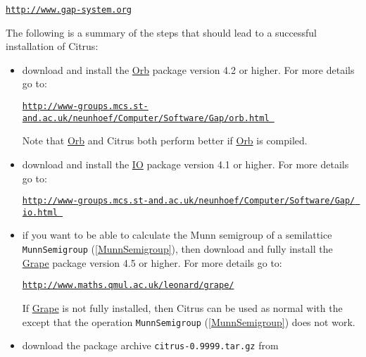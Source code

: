 \documentclass[a4paper,11pt]{report}
\begin{document}
{{\noindent\vspace{\baselineskip} \href{http://www.gap-system.org} {\texttt{http://www.gap-system.org}}

 \noindent The following is a summary of the steps that should lead to a successful
installation of \textsf{Citrus}: 
\begin{itemize}
\item  download and install the \href{ http://www-groups.mcs.st-and.ac.uk/~neunhoef/Computer/Software/Gap/orb.html } {Orb} package version 4.2 or higher. For more details go to: \vspace{\baselineskip}

\noindent \href{http://www-groups.mcs.st-and.ac.uk/~neunhoef/Computer/Software/Gap/orb.html } {\texttt{http://www-groups.mcs.st-and.ac.uk/\texttt{}neunhoef/Computer/Software/Gap/orb.html }}

 \noindent Note that \href{ http://www-groups.mcs.st-and.ac.uk/~neunhoef/Computer/Software/Gap/orb.html } {Orb} and \textsf{Citrus} both perform better if \href{ http://www-groups.mcs.st-and.ac.uk/~neunhoef/Computer/Software/Gap/orb.html } {Orb} is compiled. 
\item  download and install the \href{ http://www-groups.mcs.st-and.ac.uk/~neunhoef/Computer/Software/Gap/io.html } {IO} package version 4.1 or higher. For more details go to: \vspace{\baselineskip}

\noindent \href{http://www-groups.mcs.st-and.ac.uk/~neunhoef/Computer/Software/Gap/ io.html } {\texttt{http://www-groups.mcs.st-and.ac.uk/\texttt{}neunhoef/Computer/Software/Gap/ io.html }} 
\item  if you want to be able to calculate the Munn semigroup of a semilattice \texttt{MunnSemigroup} (\ref{MunnSemigroup}), then download and fully install the \href{http://www.maths.qmul.ac.uk/~leonard/grape/} {Grape} package version 4.5 or higher. For more details go to:\vspace{\baselineskip}

\noindent \href{http://www.maths.qmul.ac.uk/~leonard/grape/} {\texttt{http://www.maths.qmul.ac.uk/\texttt{}leonard/grape/}}

 If \href{http://www.maths.qmul.ac.uk/~leonard/grape/} {Grape} is not fully installed, then \textsf{Citrus} can be used as normal with the except that the operation \texttt{MunnSemigroup} (\ref{MunnSemigroup}) does not work. 
\item  download the package archive \texttt{citrus-0.9999.tar.gz} from \vspace{\baselineskip}


\end{itemize}}}
\end{document}
